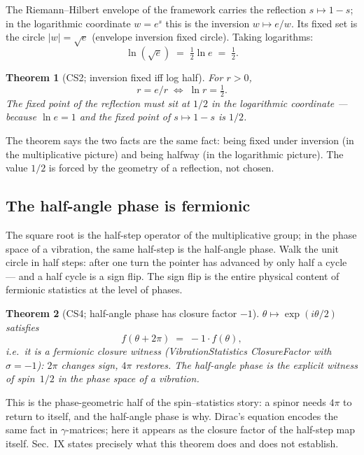 \documentclass[aps,prd,preprint,superscriptaddress,amsmath,amssymb]{revtex4-2}
\newtheorem{theorem}{Theorem}[section]
\begin{document}
The Riemann--Hilbert envelope of the framework
\cite{RiemannHIBS} carries the reflection $s\mapsto 1-s$; in the
logarithmic coordinate $w=e^s$ this is the inversion $w\mapsto e/w$.
Its fixed set is the circle $|w|=\sqrt e$ (envelope inversion fixed
circle).  Taking logarithms:
\begin{equation}
\label{eq:half}
\ln(\sqrt e)\;=\;\tfrac12\ln e\;=\;\tfrac12 .
\end{equation}

\begin{theorem}[CS2; inversion fixed iff log half]
\label{thm:cs2}
For $r>0$,
\[
r=e/r \;\Longleftrightarrow\; \ln r=\tfrac12 .
\]
The fixed point of the reflection must sit at $1/2$ in the
logarithmic coordinate --- because $\ln e=1$ and the fixed point of
$s\mapsto 1-s$ is $1/2$.
\end{theorem}

The theorem says the two facts are the same fact: being fixed under
inversion (in the multiplicative picture) and being halfway (in the
logarithmic picture).  The value $1/2$ is forced by the geometry of a
reflection, not chosen.

\subsection{The half-angle phase is fermionic}

The square root is the half-step operator of the multiplicative group;
in the phase space of a vibration, the same half-step is the half-angle
phase.  Walk the unit circle in half steps: after one turn the pointer
has advanced by only half a cycle --- and a half cycle is a sign flip.
The sign flip is the entire physical content of fermionic statistics at
the level of phases.

\begin{theorem}[CS4; half-angle phase has closure factor $-1$]
\label{thm:cs4}
$\theta\mapsto\exp(i\theta/2)$ satisfies
\[
f(\theta+2\pi)\;=\;-1\cdot f(\theta),
\]
i.e.\ it is a fermionic closure witness (VibrationStatistics
ClosureFactor with $\sigma=-1$): $2\pi$ changes sign, $4\pi$
restores.  The half-angle phase is the explicit witness of
spin~$1/2$ in the phase space of a vibration.
\end{theorem}

This is the phase-geometric half of the spin--statistics story: a
spinor needs $4\pi$ to return to itself, and the half-angle phase is
why.  Dirac's equation \cite{dirac1928quantum} encodes the same fact
in $\gamma$-matrices; here it appears as the closure factor of the
half-step map itself.  Sec.~IX states precisely what this theorem does
and does not establish.
\end{document}
